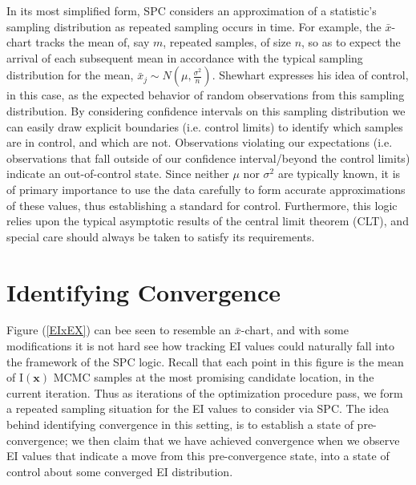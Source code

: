 \documentclass[12pt]{article}
\def \ix {
	\text{I}(\bm{x})
}
\begin{document}
	
	In its most simplified form, SPC  considers an approximation of a statistic's sampling distribution as repeated sampling occurs in time.
	For example, the $\bar x$-chart tracks the mean of, say $m$, repeated samples, of size $n$, so as to expect the arrival of each subsequent mean in accordance with the typical sampling distribution for the mean, $\bar{x}_j \sim N\left(\mu, \frac{\sigma^2}{n}\right)$.   
	Shewhart expresses his idea of control, in this case, as the expected behavior of random observations from this sampling distribution.
	By considering confidence intervals on this sampling distribution we can easily draw explicit boundaries (i.e. control limits) to identify which samples are in control, and which are not.
	Observations violating our expectations (i.e. observations that fall outside of our confidence interval/beyond the control limits) indicate an out-of-control state.
	Since neither $\mu$ nor $\sigma^2$ are typically known, it is of primary importance to use the data carefully to form accurate approximations of these values, thus establishing a standard for control.
	Furthermore, this logic relies upon the typical asymptotic results of the central limit theorem (CLT), and special care should always be taken to satisfy its requirements.
	
\clearpage
%
%
\section{Identifying Convergence}
%
%
	
	Figure (\ref{EIxEX}) can bee seen to resemble an $\bar x$-chart, and with some modifications it is not hard see how tracking EI values could naturally fall into the framework of the SPC logic.
	Recall that each point in this figure is the mean of $\ix$ MCMC samples at the most promising candidate location, in the current iteration.
	Thus as iterations of the optimization procedure pass, we form a repeated sampling situation for the EI values to consider via SPC.
	The idea behind identifying convergence in this setting, is to establish a state of pre-convergence; we then claim that we have achieved convergence when we observe EI values that indicate a move from this pre-convergence state, into a state of control about some converged EI distribution. 
	
\end{document}
